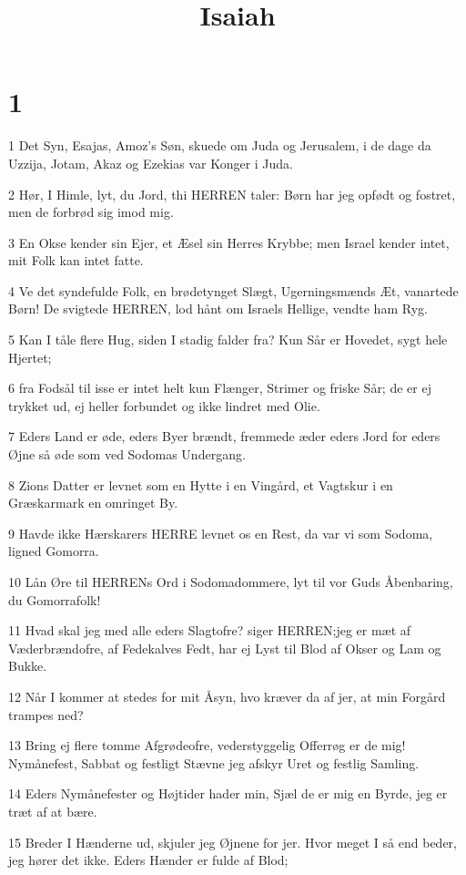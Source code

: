 

\title{Isaiah}


\chapter{1}

\par 1 Det Syn, Esajas, Amoz's Søn, skuede om Juda og Jerusalem, i de dage da Uzzija, Jotam, Akaz og Ezekias var Konger i Juda.
\par 2 Hør, I Himle, lyt, du Jord, thi HERREN taler: Børn har jeg opfødt og fostret, men de forbrød sig imod mig.
\par 3 En Okse kender sin Ejer, et Æsel sin Herres Krybbe; men Israel kender intet, mit Folk kan intet fatte.
\par 4 Ve det syndefulde Folk, en brødetynget Slægt, Ugerningsmænds Æt, vanartede Børn! De svigtede HERREN, lod hånt om Israels Hellige, vendte ham Ryg.
\par 5 Kan I tåle flere Hug, siden I stadig falder fra? Kun Sår er Hovedet, sygt hele Hjertet;
\par 6 fra Fodsål til isse er intet helt kun Flænger, Strimer og friske Sår; de er ej trykket ud, ej heller forbundet og ikke lindret med Olie.
\par 7 Eders Land er øde, eders Byer brændt, fremmede æder eders Jord for eders Øjne så øde som ved Sodomas Undergang.
\par 8 Zions Datter er levnet som en Hytte i en Vingård, et Vagtskur i en Græskarmark en omringet By.
\par 9 Havde ikke Hærskarers HERRE levnet os en Rest, da var vi som Sodoma, ligned Gomorra.
\par 10 Lån Øre til HERRENs Ord i Sodomadommere, lyt til vor Guds Åbenbaring, du Gomorrafolk!
\par 11 Hvad skal jeg med alle eders Slagtofre? siger HERREN;jeg er mæt af Væderbrændofre, af Fedekalves Fedt, har ej Lyst til Blod af Okser og Lam og Bukke.
\par 12 Når I kommer at stedes for mit Åsyn, hvo kræver da af jer, at min Forgård trampes ned?
\par 13 Bring ej flere tomme Afgrødeofre, vederstyggelig Offerrøg er de mig! Nymånefest, Sabbat og festligt Stævne jeg afskyr Uret og festlig Samling.
\par 14 Eders Nymånefester og Højtider hader min, Sjæl de er mig en Byrde, jeg er træt af at bære.
\par 15 Breder I Hænderne ud, skjuler jeg Øjnene for jer. Hvor meget I så end beder, jeg hører det ikke. Eders Hænder er fulde af Blod;
